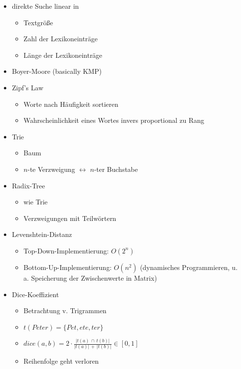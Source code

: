 \documentclass[nonacm=true, language=german]{acmart}
\newcommand{\set}[1]{\{#1\}}
\begin{document}
\begin{itemize}
    \item direkte Suche linear in
    \begin{itemize}
        \item Textgröße
        \item Zahl der Lexikoneinträge
        \item Länge der Lexikoneinträge
    \end{itemize}
    
    \item Boyer-Moore (basically KMP)
    \item Zipf's Law
    \begin{itemize}
        \item Worte nach Häufigkeit sortieren
        \item Wahrscheinlichkeit eines Wortes invers proportional zu Rang
    \end{itemize}
    
    \item Trie
    \begin{itemize}
        \item Baum
        \item $n$-te Verzweigung $\leftrightarrow$ $n$-ter Buchstabe
    \end{itemize}
    
    \item Radix-Tree
    \begin{itemize}
        \item wie Trie
        \item Verzweigungen mit Teilwörtern
    \end{itemize}
    
    \item Levenshtein-Distanz
    \begin{itemize}
        \item Top-Down-Implementierung: $O(2^n)$
        \item Bottom-Up-Implementierung: $O(n^2)$ (dynamisches Programmieren, u. a. Speicherung der Zwischenwerte in Matrix)
    \end{itemize}
    
    \item Dice-Koeffizient
    \begin{itemize}
        \item Betrachtung v. Trigrammen
        \item $ t(Peter) = \set{Pet, ete, ter} $
        \item $ dice(a, b) = 2 \cdot \frac{|t(a) \, \cap \, t(b)|}{|t(a)| \, + \, |t(b)|} \in [0, 1] $
        \item Reihenfolge geht verloren
    \end{itemize}
\end{itemize}
\end{document}
